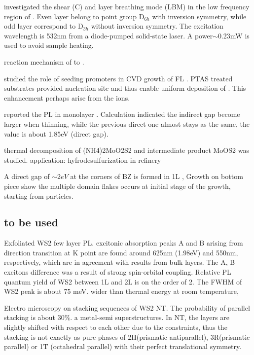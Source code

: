 \citeauthor{Zhang2013e} investigated the shear (C) and layer breathing mode (LBM) in the low frequency region of .\cite{Zhang2013e} Even layer  belong to point group D$_{6h}$ with inversion symmetry, while odd layer  correspond to D$_{3h}$ without inversion symmetry. The excitation wavelength is 532nm from a diode-pumped solid-state laser. A power$\sim$0.23mW is used to avoid sample heating.

reaction mechanism of  to .\cite{Weber1996}

\citeauthor{Ling2014} studied the role of seeding promoters in CVD growth of FL .\cite{Ling2014} PTAS treated substrates provided nucleation site and thus enable uniform deposition of .  This enhancement perhaps arise from the  ions.

\citeauthor{Splendiani2010} reported the PL in monolayer .  Calculation indicated the indirect gap become larger when thinning, while the previous direct one almost stays as the same, the value is about 1.85eV (direct gap).\cite{Splendiani2010}


thermal decomposition of (NH4)2MoO2S2 and intermediate product MoOS2 was studied. application: hyfrodesulfurization in refinery \cite{Weber1996}

 \cite{Stoffels1999}


A direct gap of $\sim 2eV$ at the corners of BZ is formed in 1L , Growth on bottom piece show the multiple domain flakes occurs at initial stage of the growth, starting from  particles.
\subsection{to be used}

Exfoliated WS2 few layer PL.\cite{Zhao2012} excitonic absorption peaks A and B arising from direction transition at K point are found around 625nm (1.98eV) and 550nm, respectively, which are in agreement with results from bulk layers. The A, B excitons difference was a result of strong spin-orbital coupling. Relative PL quantum yield of WS2 between 1L and 2L is on the order of 2. The FWHM of WS2 peak is about 75 meV. wider than thermal energy at room temperature,

Electro microscopy on stacking sequences of WS2 NT.\cite{Houben2012} The probability of parallel stacking is about 30\%. a metal-semi superstructures. In NT, the layers are slightly shifted with respect to each other due to the constraints, thus the stacking is not exactly as pure phases of 2H(prismatic antiparallel), 3R(prismatic parallel) or 1T (octahedral parallel) with their perfect translational symmetry.


